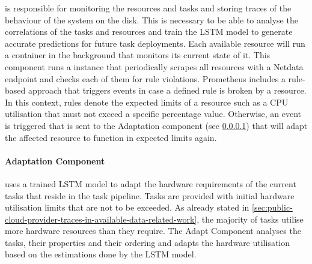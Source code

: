           is responsible for monitoring the resources and tasks and storing traces of the behaviour of the system on the disk.
          This is necessary to be able to analyse the correlations of the tasks and resources and train the LSTM model to generate accurate predictions for future task deployments. Each available resource will run a  container in the background that monitors its current state of it. 
          This component runs a  instance that periodically scrapes all resources with a Netdata endpoint and checks each of them for rule violations. Prometheus includes a rule-based approach that triggers events in case a defined rule is broken by a resource.
          In this context, rules denote the expected limits of a resource such as a CPU utilisation that must not exceed a specific percentage value.
          Otherwise, an event is triggered that is sent to the Adaptation component (see \ref{par:adapt-component-saa-background}) that will adapt the affected resource to function in expected limits again.
      
        
        \paragraph{Adaptation Component}
        \label{par:adapt-component-saa-background}
        
          uses a trained LSTM model to adapt the hardware requirements of the current tasks that reside in the task pipeline.
          Tasks are provided with initial hardware utilisation limits that are not to be exceeded. As already stated in \ref{sec:public-cloud-provider-traces-in-available-data-related-work}, the majority of tasks utilise more hardware resources than they require. The Adapt Component analyses the tasks, their properties and their ordering and adapts the hardware utilisation based on the estimations done by the LSTM model.

